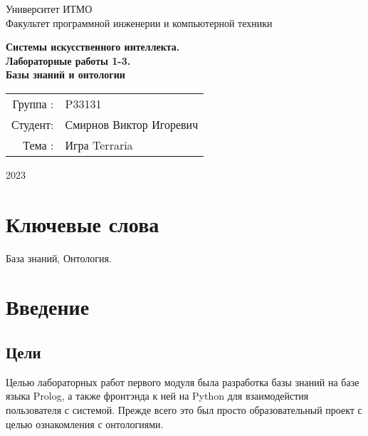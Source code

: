 \documentclass{article}
\begin{document}
\begin{titlepage}
  \begin{center}
    \begin{spacing}{1.4}
      \large{Университет ИТМО} \\
      \large{Факультет программной инженерии и компьютерной техники} \\
    \end{spacing}
    \vfill
    \textbf{
      \huge{Системы искусственного интеллекта.} \\
      \huge{Лабораторные работы 1-3.} \\
      \huge{Базы знаний и онтологии} \\
    }
  \end{center}
  \vfill
  \begin{center}
    \begin{tabular}{r l}
      Группа : & P33131                  \\
      Студент: & Смирнов Виктор Игоревич \\
      Тема   : & Игра Terraria           \\
    \end{tabular}
  \end{center}
  \vfill
  \begin{center}
    \begin{large}
      2023
    \end{large}
  \end{center}
\end{titlepage}

\section*{Ключевые слова}
База знаний, Онтология.

\tableofcontents

\section{Введение}

\subsection{Цели}

Целью лабораторных работ первого модуля
была разработка базы знаний на базе языка
Prolog, а также фронтэнда к ней на Python для
взаимодейстия пользователя с системой.
Прежде всего это был просто образовательный
проект с целью ознакомления с онтологиями.
\end{document}
